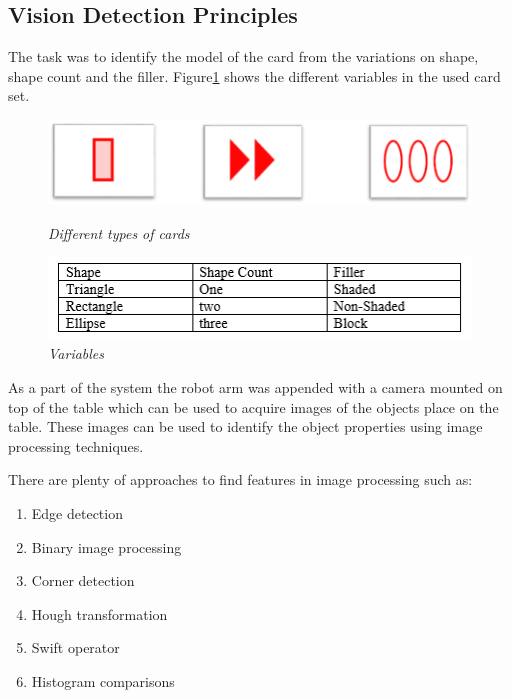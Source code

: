 \subsection{Vision Detection Principles}

The task was to identify the model of the card from the variations on shape, shape count and the filler. Figure\ref{cardtyps} shows the different variables in the used card set.

	\begin{figure}[position = here]
		\begin{centering}
			\includegraphics[scale=0.6]{./sachiths_images/image123.png}\\
			\caption[]{\textit{Different types of cards\label{cardtyps}}}
		\end{centering}
	\end{figure}
	
	\begin{figure}[position = here]
		\centering
		\includegraphics[scale=0.8]{./sachiths_images/image2.png}
		\caption[]{\textit{Variables}}
	\end{figure}

As a part of the system the robot arm was appended with a camera mounted on top of the table which can be used to acquire images of the objects place on the table. These images can be used to identify the object properties using image processing techniques. 

There are plenty of approaches to find features in image processing such as:

\begin{enumerate}
	\item Edge detection
	\item Binary image processing\cite{MachineVision}
	\item Corner detection
	\item Hough transformation
	\item Swift operator
	\item Histogram comparisons
\end{enumerate}

